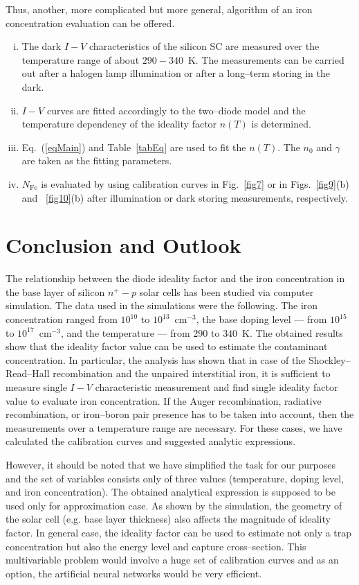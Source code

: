 \documentclass [sort&compress] {elsarticle}
\begin{document}
Thus, another, more complicated but more general, algorithm of an iron concentration evaluation can be offered.
\begin{enumerate}[(i)]
\item The dark $I-V$ characteristics of the silicon SC are measured over the temperature range of about $290-340$~K.
   The measurements can be carried out  after a halogen lamp illumination or after a long--term storing in the dark.
\item $I-V$ curves are fitted accordingly to the two--diode model and the temperature dependency of the ideality factor $n(T)$ is determined.
\item Eq.~(\ref{eqMain}) and Table~\ref{tabEq} are used to fit the $n(T)$.
 The $n_0$ and $\gamma$ are taken as the fitting parameters.
\item $N_\mathrm{Fe}$ is evaluated by using calibration curves in Fig.~\ref{fig7} or in Figs.~\ref{fig9}(b) and ~\ref{fig10}(b)
 after illumination or dark storing measurements, respectively.
\end{enumerate}


\section{Conclusion and Outlook}
The relationship between the diode ideality factor and the iron concentration in the base layer of silicon $n^+-p$ solar cells has been studied via computer simulation.
The data used in the simulations were the following.
The iron concentration ranged from $10^{10}$ to $10^{13}$~cm$^{-3}$,
the base doping level --- from $10^{15}$ to $10^{17}$~cm$^{-3}$,
and the temperature --- from $290$ to $340$~K.
The obtained results show that the ideality factor value can be used to estimate the contaminant concentration.
In particular, the analysis has shown that in case of the Shockley--Read--Hall recombination and the unpaired interstitial iron, it is sufficient to measure single $I-V$ characteristic measurement and find single ideality factor value to evaluate iron concentration.
If the Auger recombination, radiative recombination, or iron--boron pair presence has to be taken into account,
then the measurements over a temperature range are necessary.
For these cases, we have calculated the calibration curves and suggested analytic expressions.

However, it should be noted that we have simplified the task for our purposes and the set of variables consists only of three values (temperature, doping level, and iron concentration).
The obtained analytical expression is supposed to be used only for approximation case.
As shown by the simulation, the geometry of the solar cell (e.g. base layer thickness) also affects the magnitude of ideality factor.
In general case, the ideality factor can be used to estimate not only a trap concentration but also the energy level and capture cross--section.
This multivariable problem would involve a huge set of calibration curves and as an option, the artificial neural networks would be very efficient.


\end{document}
